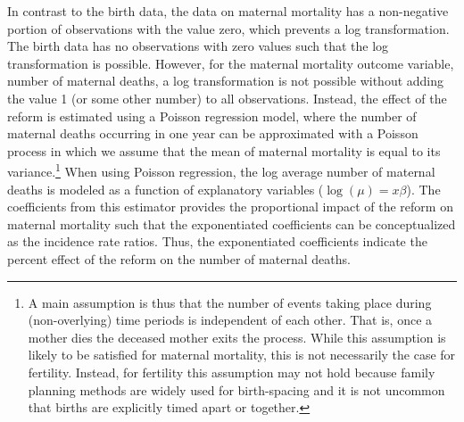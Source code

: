 \documentclass[a4paper, 11pt]{article}
\begin{document}
\begin{spacing}{2}
In contrast to the birth data, the data on maternal mortality has a non-negative portion of observations with the value zero, which prevents a log transformation. The birth data has no observations with zero values such that the log transformation is possible. However, for the maternal mortality outcome variable, number of maternal deaths, a log transformation is not possible without adding the value 1 (or some other number) to all observations. Instead, the effect of the reform is estimated using a Poisson regression model, where the number of maternal deaths occurring in one year can be approximated with a Poisson process in which we assume that the mean of maternal mortality is equal to its variance.\footnote{A main assumption is thus that the number of events taking place during (non-overlying) time periods is independent of each other. That is, once a mother dies the deceased mother exits the process. While this assumption is likely to be satisfied for maternal mortality, this is not necessarily the case for fertility. Instead, for fertility this assumption may not hold because family planning methods are widely used for birth-spacing and it is not uncommon that births are explicitly timed apart or together.} When using Poisson regression, the log average number of maternal deaths is modeled as a function of explanatory variables ($\log(\mu) =x\beta$). The coefficients from this estimator provides the proportional impact of the reform on maternal mortality such that the exponentiated coefficients can be conceptualized as the incidence rate ratios. Thus, the exponentiated coefficients indicate the percent effect of the reform on the number of maternal deaths.         
   

\end{spacing}
\end{document}
